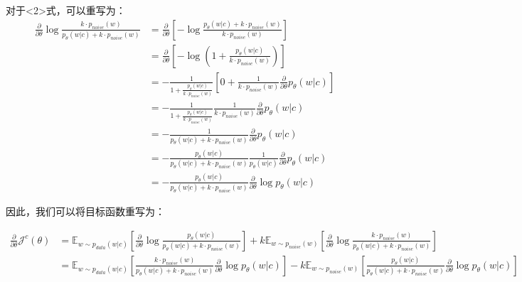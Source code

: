 \documentclass{article}
\begin{document}
对于<2>式，可以重写为：
\begin{equation}
    \begin{split}
        \frac{\partial}{\partial \theta} \log \frac{k \cdot p_{noise}(w)}{p_\theta (w|c) + k \cdot p_{noise}(w)} &= \frac{\partial}{\partial \theta} \left[ - \log \frac{p_\theta (w|c) + k \cdot p_{noise}(w)}{k \cdot p_{noise}(w)} \right] \\
        &= \frac{\partial}{\partial \theta} \left[ - \log (1+ \frac{p_\theta(w|c)}{k \cdot p_{noise}(w)}) \right] \\
        &= - \frac{1}{1+ \frac{p_\theta(w|c)}{k \cdot p_{noise}(w)}} \left[ 0 + \frac{1}{k \cdot p_{noise}(w)} \frac{\partial}{\partial \theta} p_\theta(w|c) \right] \\
        &= - \frac{1}{1+ \frac{p_\theta(w|c)}{k \cdot p_{noise}(w)}} \frac{1}{k \cdot p_{noise}(w)} \frac{\partial}{\partial \theta} p_\theta(w|c) \\
        &= - \frac{1}{p_\theta (w|c) + k \cdot p_{noise}(w)} \frac{\partial}{\partial \theta} p_\theta(w|c) \\
        &= - \frac{p_\theta(w|c)}{p_\theta (w|c) + k \cdot p_{noise}(w)} \frac{1}{p_\theta(w|c)} \frac{\partial}{\partial \theta} p_\theta(w|c) \\
        &= - \frac{p_\theta(w|c)}{p_\theta (w|c) + k \cdot p_{noise}(w)} \frac{\partial}{\partial \theta} \log p_\theta(w|c)
    \end{split}
\end{equation}

因此，我们可以将目标函数重写为：

\begin{equation}
    \begin{split}
        \frac{\partial}{\partial \theta} \mathcal{J}^c (\theta) &= \mathbb{E}_{w \sim p_{data}(w|c)} \left[ \frac{\partial}{\partial \theta} \log \frac{p_\theta(w|c)}{p_\theta(w|c)+k \cdot p_{noise}(w)} \right] + k  \mathbb{E}_{w \sim p_{noise}(w)} \left[ \frac{\partial}{\partial \theta} \log \frac{k \cdot p_{noise}(w)}{p_\theta(w|c)+k \cdot p_{noise}(w)}  \right] \\
        &= \mathbb{E}_{w \sim p_{data}(w|c)} \left[ \frac{k \cdot p_{noise}(w)}{p_\theta(w|c) + k \cdot p_{noise}(w)}  \frac{\partial}{\partial \theta} \log p_\theta(w|c) \right] -  k  \mathbb{E}_{w \sim p_{noise}(w)} \left[ \frac{p_\theta(w|c)}{p_\theta (w|c) + k \cdot p_{noise}(w)} \frac{\partial}{\partial \theta} \log p_\theta(w|c) \right]
    \end{split}
\end{equation}
\end{document}
